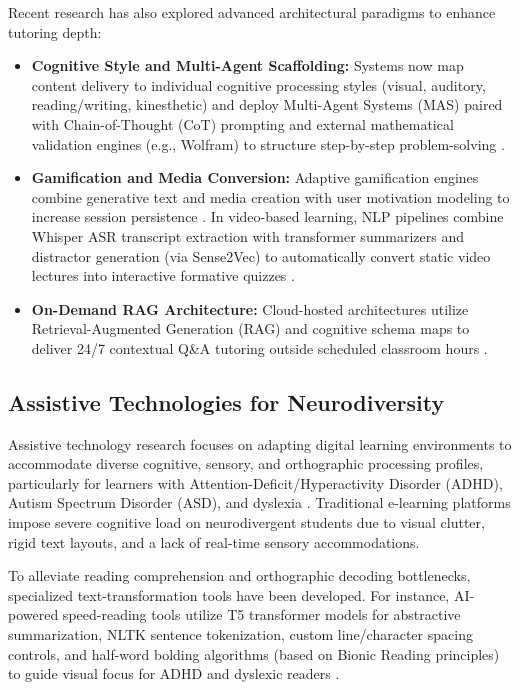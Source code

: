\documentclass[final,5p,times,twocolumn,authoryear]{elsarticle}
\begin{document}
Recent research has also explored advanced architectural paradigms to enhance tutoring depth:
\begin{itemize}
    \item \textbf{Cognitive Style and Multi-Agent Scaffolding:} Systems now map content delivery to individual cognitive processing styles (visual, auditory, reading/writing, kinesthetic) \cite{9} and deploy Multi-Agent Systems (MAS) paired with Chain-of-Thought (CoT) prompting and external mathematical validation engines (e.g., Wolfram) to structure step-by-step problem-solving \cite{21}.
    \item \textbf{Gamification and Media Conversion:} Adaptive gamification engines combine generative text and media creation with user motivation modeling to increase session persistence \cite{7}. In video-based learning, NLP pipelines combine Whisper ASR transcript extraction with transformer summarizers and distractor generation (via Sense2Vec) to automatically convert static video lectures into interactive formative quizzes \cite{17}.
    \item \textbf{On-Demand RAG Architecture:} Cloud-hosted architectures utilize Retrieval-Augmented Generation (RAG) and cognitive schema maps to deliver 24/7 contextual Q\&A tutoring outside scheduled classroom hours \cite{22}.
\end{itemize}

\subsection{Assistive Technologies for Neurodiversity}
\label{subsec:related_assistive}

Assistive technology research focuses on adapting digital learning environments to accommodate diverse cognitive, sensory, and orthographic processing profiles, particularly for learners with Attention-Deficit/Hyperactivity Disorder (ADHD), Autism Spectrum Disorder (ASD), and dyslexia \cite{16}. Traditional e-learning platforms impose severe cognitive load on neurodivergent students due to visual clutter, rigid text layouts, and a lack of real-time sensory accommodations.

To alleviate reading comprehension and orthographic decoding bottlenecks, specialized text-transformation tools have been developed. For instance, AI-powered speed-reading tools utilize T5 transformer models for abstractive summarization, NLTK sentence tokenization, custom line/character spacing controls, and half-word bolding algorithms (based on Bionic Reading principles) to guide visual focus for ADHD and dyslexic readers \cite{15}. 
\end{document}
